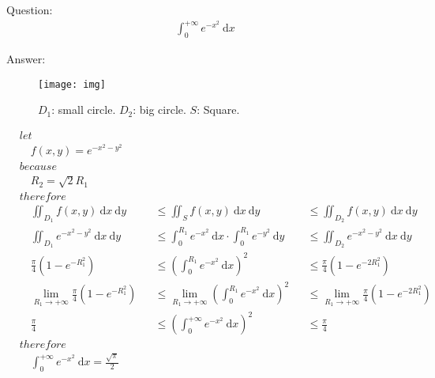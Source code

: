 \documentclass{article}
\begin{document}
	\large
	\setlength{\baselineskip}{3em}
	
	\renewcommand{\d}[1][x]{\ \text{d}#1}
	
	Question:
	\begin{align*}
		\int_{0}^{+\infty} e^{-x^2} \d
	\end{align*}
	
	Answer:
	\begin{figure}[h]
		\centering
		\texttt{[image: img]}
		\caption{$D_1$: small circle. $D_2$: big circle. $S$: Square.}
		\label{fig:img}
	\end{figure}
	\begin{align*}
		& let
		\\
		& \quad f(x, y) = e^{- x^2 - y^2}
		\\
		& because
		\\
		& \quad R_2 = \sqrt{2} R_1
		\\
		& therefore
		\\
		& \quad \iint_{D_1} f(x, y) \d[x] \d[y] & & \le \iint_{S} f(x, y) \d[x] \d[y] && \le \iint_{D_2} f(x, y) \d[x] \d[y]
		\\
		& \quad \iint_{D_1} e^{- x^2 - y^2} \d[x] \d[y] & & \le \int_{0}^{R_1} e^{-x^2} \d[x] \cdot \int_{0}^{R_1} e^{-y^2} \d[y] && \le \iint_{D_2} e^{- x^2 - y^2} \d[x] \d[y]
		\\
		& \quad \frac{\pi}{4} (1 - e^{-R_1^2}) & & \le \left( \int_{0}^{R_1} e^{-x^2} \d[x] \right)^2 && \le \frac{\pi}{4} (1 - e^{-2 R_1^2})
		\\
		& \quad \lim_{R_1 \to +\infty} \frac{\pi}{4} (1 - e^{-R_1^2}) & & \le \lim_{R_1 \to +\infty} \left( \int_{0}^{R_1} e^{-x^2} \d[x] \right)^2 && \le \lim_{R_1 \to +\infty} \frac{\pi}{4} (1 - e^{-2 R_1^2})
		\\
		& \quad \frac{\pi}{4} & & \le \left( \int_{0}^{+\infty} e^{-x^2} \d[x] \right)^2 && \le \frac{\pi}{4}
		\\
		& therefore
		\\
		& \quad \int_{0}^{+\infty} e^{-x^2} \d[x] = \frac{\sqrt{\pi}}{2}
	\end{align*}
\end{document}
